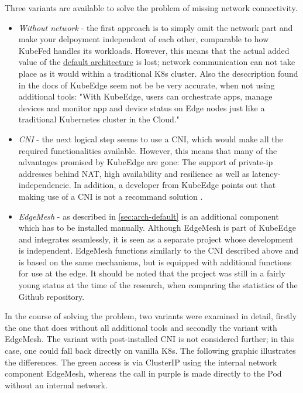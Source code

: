 \documentclass[MSC,Master,english]{twbook}%
\begin{document}
Three variants are available to solve the problem of missing network connectivity.
\begin{itemize}
    \item \textit{Without network} - the first approach is to simply omit the network part and make your delpoyment independent of each other, comparable to how KubeFed handles its workloads. However, this means that the actual added value of the \hyperref[sec:arch-default]{default architecture} is lost; network communication can not take place as it would within a traditional \ac{K8s} cluster. Also the desccription found in the docs of KubeEdge seem not be be very accurate, when not using additional tools: "With KubeEdge, users can orchestrate apps, manage devices and monitor app and device status on Edge nodes just like a traditional Kubernetes cluster in the Cloud." \cite{ke-docs-why}
    \item \textit{CNI} - the next logical step seems to use a \ac{CNI}, which would make all the required functionalities available. However, this means that many of the advantages promised by KubeEdge are gone: The support of private-ip addresses behind \ac{NAT}, high availability and resilience as well as latency-independencie. In addition, a developer from KubeEdge points out that making use of a \ac{CNI} is not a recommand solution \cite{ke-cni-no}.
    \item \textit{EdgeMesh} - as described in \autoref{sec:arch-default} is an additional component which has to be installed manually. Although EdgeMesh is part of KubeEdge and integrates seamlessly, it is seen as a separate project whose development is independent. EdgeMesh functions similarly to the \ac{CNI} described above and is based on the same mechanisms, but is equipped with additional functions for use at the edge. It should be noted that the project was still in a fairly young status at the time of the research, when comparing the statistics of the Github repository.
\end{itemize}
In the course of solving the problem, two variants were examined in detail, firstly the one that does without all additional tools and secondly the variant with EdgeMesh. The variant with post-installed CNI is not considered further; in this case, one could fall back directly on vanilla \ac{K8s}. The following graphic illustrates the differences. The green access is via ClusterIP using the internal network component EdgeMesh, whereas the call in purple is made directly to the Pod without an internal network.
\end{document}
